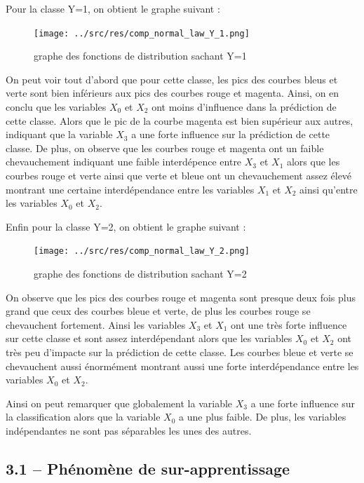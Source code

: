\documentclass[
]{article}
\begin{document}
\newpage{}

Pour la classe Y=1, on obtient le graphe suivant :

\begin{figure}
\centering
\texttt{[image: ../src/res/comp\_normal\_law\_Y\_1.png]}
\caption{graphe des fonctions de distribution sachant Y=1}
\end{figure}

On peut voir tout d'abord que pour cette classe, les pics des courbes
bleus et verte sont bien inférieurs aux pics des courbes rouge et
magenta. Ainsi, on en conclu que les variables \(X_0\) et \(X_2\) ont
moins d'influence dans la prédiction de cette classe. Alors que le pic
de la courbe magenta est bien supérieur aux autres, indiquant que la
variable \(X_3\) a une forte influence sur la prédiction de cette
classe. De plus, on observe que les courbes rouge et magenta ont un
faible chevauchement indiquant une faible interdépence entre \(X_3\) et
\(X_1\) alors que les courbes rouge et verte ainsi que verte et bleue
ont un chevauchement assez élevé montrant une certaine interdépendance
entre les variables \(X_1\) et \(X_2\) ainsi qu'entre les variables
\(X_0\) et \(X_2\).

\newpage{}

Enfin pour la classe Y=2, on obtient le graphe suivant :

\begin{figure}
\centering
\texttt{[image: ../src/res/comp\_normal\_law\_Y\_2.png]}
\caption{graphe des fonctions de distribution sachant Y=2}
\end{figure}

On observe que les pics des courbes rouge et magenta sont presque deux
fois plus grand que ceux des courbes bleue et verte, de plus les courbes
rouge se chevauchent fortement. Ainsi les variables \(X_3\) et \(X_1\)
ont une très forte influence sur cette classe et sont assez
interdépendant alors que les variables \(X_0\) et \(X_2\) ont très peu
d'impacte sur la prédiction de cette classe. Les courbes bleue et verte
se chevauchent aussi énormément montrant aussi une forte interdépendance
entre les variables \(X_0\) et \(X_2\).

Ainsi on peut remarquer que globalement la variable \(X_3\) a une forte
influence sur la classification alors que la variable \(X_0\) a une plus
faible. De plus, les variables indépendantes ne sont pas séparables les
unes des autres.

\hypertarget{phuxe9nomuxe8ne-de-sur-apprentissage}{%
\subsection{3.1 -- Phénomène de
sur-apprentissage}\label{phuxe9nomuxe8ne-de-sur-apprentissage}}
\end{document}
